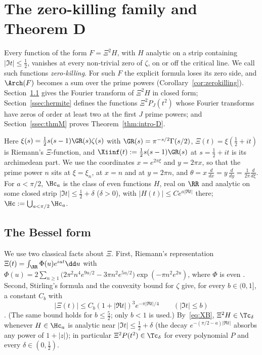 \section{The zero-killing family and Theorem D}\label{sec:family}

Every function of the form $F=\Xi^2H$, with $H$ analytic on a strip containing $\lvert\Im t\rvert\le\frac12$, vanishes at every
non-trivial zero of $\zeta$, on or off the critical line. We call such functions \emph{zero-killing}. For such $F$ the explicit formula loses its zero side, and $\Arch(F)$
becomes a sum over the prime powers (Corollary~\ref{cor:zerokilling}). Section~\ref{ssec:bessel} gives the Fourier transform of $\Xi^2H$
in closed form; Section~\ref{ssec:hermite} defines the functions $\Xi^2P_J(t^2)$ whose Fourier transforms have zeros of order at least two at the
first $J$ prime powers; and Section~\ref{ssec:thmM} proves Theorem~\ref{thm:intro-D}.

Here $\xi(s)=\frac12s(s-1)\GR(s)\zeta(s)$ with $\GR(s)=\pi^{-s/2}\Gamma(s/2)$, $\Xi(t)=\xi(\frac12+it)$ is Riemann's $\Xi$-function, and
$\Xiinf(t):=\frac12s(s-1)\GR(s)$ at $s=\frac12+it$ is its archimedean part. We use the coordinates $x=e^{2\pi\xi}$ and $y=2\pi x$, so that
the prime power $n$ sits at $\xi=\xi_n$, at $x=n$ and at $y=2\pi n$, and $\theta=x\,\frac{d}{dx}=y\,\frac{d}{dy}=\frac1{2\pi}\frac{d}{d\xi}$.
For $a<\pi/2$, $\Hc_a$ is the class of even functions $H$, real on $\RR$ and analytic on some closed strip
$\lvert\Im t\rvert\le\frac12+\delta$ ($\delta>0$), with $\lvert H(t)\rvert\le Ce^{a\lvert\Re t\rvert}$ there; $\Hc:=\bigcup_{a<\pi/2}\Hc_a$.

\subsection{The Bessel form}\label{ssec:bessel}

We use two classical facts about $\Xi$. First, Riemann's representation
$\Xi(t)=\int_\RR\Phi(u)e^{iut}\dd u$ with
$\Phi(u)=2\sum_{n\ge1}\bigl(2\pi^2n^4e^{9u/2}-3\pi n^2e^{5u/2}\bigr)\exp(-\pi n^2e^{2u})$, where
$\Phi$ is even \cite[p.~305, (2)--(3) and the remark after (4)]{Pol26}. Second, Stirling's formula and the convexity bound for
$\zeta$ give, for every $b\in(0,1]$, a constant $C_b$ with
\begin{equation}\label{eq:XB}
\lvert\Xi(t)\rvert\le C_b(1+\lvert\Re t\rvert)^{3}e^{-\pi\lvert\Re t\rvert/4}\qquad(\lvert\Im t\rvert\le b)
\end{equation}
\cite{Tit86}. (The same bound holds for $b\le\frac52$; only $b<1$ is used.) By~\eqref{eq:XB}, $\Xi^2H\in\Tc_\delta$ whenever $H\in\Hc_a$ is analytic near
$\lvert\Im t\rvert\le\frac12+\delta$ (the decay $e^{-(\pi/2-a)\lvert\Re t\rvert}$ absorbs any power of $1+\lvert z\rvert$);
in particular $\Xi^2P(t^2)\in\Tc_\delta$ for every polynomial $P$ and every $\delta\in(0,\frac12)$.

